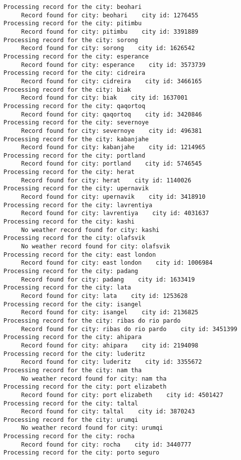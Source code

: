 \documentclass[11pt]{article}
\begin{document}
\begin{Verbatim}[commandchars=\\\{\}]
Processing record for the city: beohari
     Record found for city: beohari    city id: 1276455
Processing record for the city: pitimbu
     Record found for city: pitimbu    city id: 3391889
Processing record for the city: sorong
     Record found for city: sorong    city id: 1626542
Processing record for the city: esperance
     Record found for city: esperance    city id: 3573739
Processing record for the city: cidreira
     Record found for city: cidreira    city id: 3466165
Processing record for the city: biak
     Record found for city: biak    city id: 1637001
Processing record for the city: qaqortoq
     Record found for city: qaqortoq    city id: 3420846
Processing record for the city: severnoye
     Record found for city: severnoye    city id: 496381
Processing record for the city: kabanjahe
     Record found for city: kabanjahe    city id: 1214965
Processing record for the city: portland
     Record found for city: portland    city id: 5746545
Processing record for the city: herat
     Record found for city: herat    city id: 1140026
Processing record for the city: upernavik
     Record found for city: upernavik    city id: 3418910
Processing record for the city: lavrentiya
     Record found for city: lavrentiya    city id: 4031637
Processing record for the city: kashi
     No weather record found for city: kashi
Processing record for the city: olafsvik
     No weather record found for city: olafsvik
Processing record for the city: east london
     Record found for city: east london    city id: 1006984
Processing record for the city: padang
     Record found for city: padang    city id: 1633419
Processing record for the city: lata
     Record found for city: lata    city id: 1253628
Processing record for the city: isangel
     Record found for city: isangel    city id: 2136825
Processing record for the city: ribas do rio pardo
     Record found for city: ribas do rio pardo    city id: 3451399
Processing record for the city: ahipara
     Record found for city: ahipara    city id: 2194098
Processing record for the city: luderitz
     Record found for city: luderitz    city id: 3355672
Processing record for the city: nam tha
     No weather record found for city: nam tha
Processing record for the city: port elizabeth
     Record found for city: port elizabeth    city id: 4501427
Processing record for the city: taltal
     Record found for city: taltal    city id: 3870243
Processing record for the city: urumqi
     No weather record found for city: urumqi
Processing record for the city: rocha
     Record found for city: rocha    city id: 3440777
Processing record for the city: porto seguro

\end{Verbatim}
\end{document}
